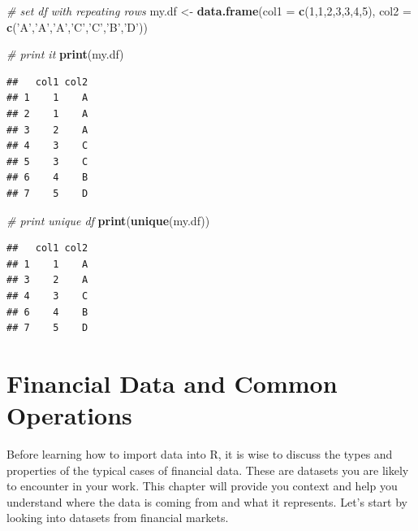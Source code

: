 \documentclass[11pt,]{book}
\newenvironment{Shaded}{\begin{snugshade}}{\end{snugshade}}
\newcommand{\KeywordTok}[1]{\textcolor[rgb]{0.27,0.27,0.27}{\textbf{#1}}}
\newcommand{\DataTypeTok}[1]{\textcolor[rgb]{0.27,0.27,0.27}{#1}}
\newcommand{\DecValTok}[1]{\textcolor[rgb]{0.06,0.06,0.06}{#1}}
\newcommand{\StringTok}[1]{\textcolor[rgb]{0.5,0.5,0.5}{#1}}
\newcommand{\CommentTok}[1]{\textcolor[rgb]{0.56,0.35,0.01}{\textit{#1}}}
\newcommand{\NormalTok}[1]{#1}
\begin{document}
\begin{Shaded}
\begin{Highlighting}[]
\CommentTok{# set df with repeating rows}
\NormalTok{my.df <-}\StringTok{ }\KeywordTok{data.frame}\NormalTok{(}\DataTypeTok{col1 =} \KeywordTok{c}\NormalTok{(}\DecValTok{1}\NormalTok{,}\DecValTok{1}\NormalTok{,}\DecValTok{2}\NormalTok{,}\DecValTok{3}\NormalTok{,}\DecValTok{3}\NormalTok{,}\DecValTok{4}\NormalTok{,}\DecValTok{5}\NormalTok{), }
                    \DataTypeTok{col2 =} \KeywordTok{c}\NormalTok{(}\StringTok{'A'}\NormalTok{,}\StringTok{'A'}\NormalTok{,}\StringTok{'A'}\NormalTok{,}\StringTok{'C'}\NormalTok{,}\StringTok{'C'}\NormalTok{,}\StringTok{'B'}\NormalTok{,}\StringTok{'D'}\NormalTok{))}

\CommentTok{# print it                  }
\KeywordTok{print}\NormalTok{(my.df)}
\end{Highlighting}
\end{Shaded}

\begin{verbatim}
##   col1 col2
## 1    1    A
## 2    1    A
## 3    2    A
## 4    3    C
## 5    3    C
## 6    4    B
## 7    5    D
\end{verbatim}

\begin{Shaded}
\begin{Highlighting}[]
\CommentTok{# print unique df}
\KeywordTok{print}\NormalTok{(}\KeywordTok{unique}\NormalTok{(my.df))}
\end{Highlighting}
\end{Shaded}

\begin{verbatim}
##   col1 col2
## 1    1    A
## 3    2    A
## 4    3    C
## 6    4    B
## 7    5    D
\end{verbatim}

\hypertarget{Financial-data}{\chapter{Financial Data and Common
Operations}\label{Financial-data}}

Before learning how to import data into R, it is wise to discuss the
types and properties of the typical cases of financial data. These are
datasets you are likely to encounter in your work. This chapter will
provide you context and help you understand where the data is coming
from and what it represents. Let's start by looking into datasets from
financial markets.
\end{document}
